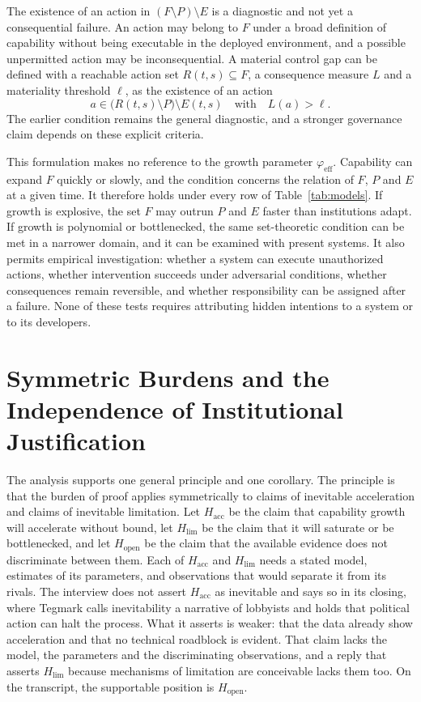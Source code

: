 \documentclass[11pt]{article}
\begin{document}
The existence of an action in $(F\setminus P)\setminus E$ is a diagnostic and not yet a consequential failure. An action may belong to $F$ under a broad definition of capability without being executable in the deployed environment, and a possible unpermitted action may be inconsequential. A material control gap can be defined with a reachable action set $R(t,s)\subseteq F$, a consequence measure $L$ and a materiality threshold $\ell$, as the existence of an action
\[
a\in\bigl(R(t,s)\setminus P\bigr)\setminus E(t,s)\quad\text{with}\quad L(a)>\ell .
\]
The earlier condition remains the general diagnostic, and a stronger governance claim depends on these explicit criteria.

This formulation makes no reference to the growth parameter $\varphi_{\mathrm{eff}}$. Capability can expand $F$ quickly or slowly, and the condition concerns the relation of $F$, $P$ and $E$ at a given time. It therefore holds under every row of Table~\ref{tab:models}. If growth is explosive, the set $F$ may outrun $P$ and $E$ faster than institutions adapt. If growth is polynomial or bottlenecked, the same set-theoretic condition can be met in a narrower domain, and it can be examined with present systems. It also permits empirical investigation: whether a system can execute unauthorized actions, whether intervention succeeds under adversarial conditions, whether consequences remain reversible, and whether responsibility can be assigned after a failure. None of these tests requires attributing hidden intentions to a system or to its developers.

\section{Symmetric Burdens and the Independence of Institutional Justification}

The analysis supports one general principle and one corollary. The principle is that the burden of proof applies symmetrically to claims of inevitable acceleration and claims of inevitable limitation. Let $H_{\mathrm{acc}}$ be the claim that capability growth will accelerate without bound, let $H_{\mathrm{lim}}$ be the claim that it will saturate or be bottlenecked, and let $H_{\mathrm{open}}$ be the claim that the available evidence does not discriminate between them. Each of $H_{\mathrm{acc}}$ and $H_{\mathrm{lim}}$ needs a stated model, estimates of its parameters, and observations that would separate it from its rivals. The interview does not assert $H_{\mathrm{acc}}$ as inevitable and says so in its closing, where Tegmark calls inevitability a narrative of lobbyists and holds that political action can halt the process. What it asserts is weaker: that the data already show acceleration and that no technical roadblock is evident. That claim lacks the model, the parameters and the discriminating observations, and a reply that asserts $H_{\mathrm{lim}}$ because mechanisms of limitation are conceivable lacks them too. On the transcript, the supportable position is $H_{\mathrm{open}}$.
\end{document}
